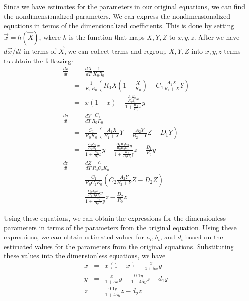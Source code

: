 \documentclass[12pt,journal,compsoc,twoside]{IEEEtran}
\begin{document}
Since we have estimates for the parameters in our original equations, we can find the nondimensionalized parameters. We can express the nondimensionalized equations in terms of the dimensionalized coefficients. This is done by setting $\vec{x} = h(\vec{X})$, where $h$ is the function that maps $X,Y,Z$ to $x,y,z$. After we have $d\vec{x}/dt$ in terms of $\vec{X}$, we can collect terms and regroup $X,Y,Z$ into $x,y,z$ terms to obtain the following:
\begin{eqnarray}
\frac{dx}{dt} &=& \frac{dX}{dT} \frac{1}{K_0 R_0} \nonumber \\
&=& \frac{1}{K_0 R_0} \left( R_0 X \left(1 - \frac{X}{K_0} \right) - C_1 \frac{A_1 X}{B_1 + X} Y \right) \nonumber \\
&=& x(1-x) - \frac{\frac{A_1 K_0}{R_0 B_1} x}{1 + \frac{K_0}{B_1} x} y \\
\frac{dy}{dt} &=& \frac{dY}{dT} \frac{C_1}{R_0 K_0} \nonumber \\
&=& \frac{C_1}{R_0 K_0} \left( \frac{A_1 X}{B_1 + X} Y - \frac{A_2 Y}{B_2 + Y} Z - D_1 Y \right) \nonumber \\
&=& \frac{ \frac{A_1 K_0}{R_0 B_1} x}{1 + \frac{K_0}{B_1} x} y - \frac{\frac{A_2 K_0 C_2}{R_0 B_2 C_1}y}{1 + \frac{K_0}{B_2 C_1} y } z - \frac{D_1}{R_0} y \\
\frac{dz}{dt} &=& \frac{dZ}{dT} \frac{C_1}{R_0 C_2 K_0} \nonumber \\
&=& \frac{C_1}{R_0 C_2 K_0} \left( C_2 \frac{A_2 Y}{B_2 + Y} Z - D_2 Z \right) \nonumber \\
&=& \frac{ \frac{C_2 A_2 K_0}{R_0 B_2 C_1} y}{1 + \frac{ K_0}{B_2 C_1} y} z - \frac{D_2}{R_0} z  
\end{eqnarray}

Using these equations, we can obtain the expressions for the dimensionless parameters in terms of the parameters from the original equation. Using these expressions, we can obtain estimated values for $a_i, b_i$, and $d_i$ based on the estimated values for the parameters from the original equations. Substituting these values into the dimensionless equations, we have:
\begin{eqnarray}
\dot{x} &=& x(1-x) - \frac{x }{1 + 5 x}y \nonumber \\
\dot{y} &=& \frac{x}{1 + 5 x} y - \frac{0.1 y}{1 + 45 y} z - d_1 y \\
\dot{z} &=& \frac{0.1 y}{1 + 45 y} z - d_2 z \nonumber
\end{eqnarray}
\end{document}
